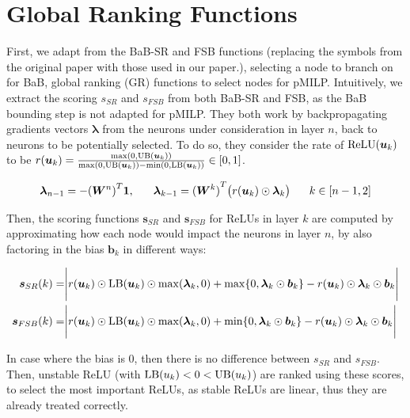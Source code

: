 \section{Global Ranking Functions}

\label{sec4p5}

First, we adapt from the BaB-SR \cite{BaB} and FSB \cite{FSB} functions (replacing the symbols from the original paper with those used in our paper.), selecting a node to branch on for BaB, global ranking (GR) functions to select nodes for pMILP. Intuitively, we extract the scoring $s_{SR}$ and $s_{FSB}$ from both BaB-SR and FSB, as the BaB bounding step is not adapted for pMILP. They both work by backpropagating gradients vectors $\bm{\lambda}$ from the neurons under consideration in layer $n$, back to neurons to be potentially selected. To do so, they consider the rate of $\mathrm{ReLU}(\bm{u}_k)$ to be 
$r(\bm{u}_k)=\frac{\max(0,\mathrm{UB}(\bm{u}_k))}{\max(0,\mathrm{UB}(\bm{u}_k))-\min(0,\mathrm{LB}(\bm{u}_k))} \in [0,1]$.

\begin{align*}
\bm{\lambda}_{n-1} = -{(\bm{W}^n)}^T\bm{1}, \hspace*{4ex}  	\bm{\lambda}_{k-1} = {(\bm{W}^k)}^T\big( r(\bm{u}_k) \odot\bm{\lambda}_{k}\big) \hspace*{4ex}  k\in [n-1,2]
\end{align*}


Then, the scoring functions $\bm{s}_{SR}$ and $\bm{s}_{FSB}$ for ReLUs in layer $k$ are computed by approximating how each node would impact the neurons in layer $n$, by also factoring in the bias $\bm{b}_k$ in different ways:

\begin{align*}
	\bm{s}_{SR}(k) =& %
	\Biggl\lvert r(\bm{u}_k) \odot \LB(\bm{u}_k) \odot \max(\bm{\lambda}_{k},0)
	+ \max\{0,\bm{\lambda}_{k}\odot\bm{b}_{k}\}-r(\bm{u}_k) \odot\bm{\lambda}_{k}\odot\bm{{b}}_{k}
	\Biggr\rvert  \\
	\bm{s}_{FSB}(k) =& \Biggl\lvert r(\bm{u}_k) \odot \LB(\bm{u}_k) \odot \max(\bm{\lambda}_{k},0)
	+ \min\{0,\bm{\lambda}_{k}\odot\bm{b}_{k}\}-r(\bm{u}_k) \odot\bm{\lambda}_{k}\odot\bm{{b}}_{k}
	\Biggr\rvert
\end{align*}

In case where the bias is 0, then there is no difference between $s_{SR}$ and $s_{FSB}$.
Then, unstable ReLU (with $\mathrm{LB}(u_k) < 0 < \mathrm{UB}(u_k)$) are ranked using these scores, to select the most important ReLUs, as stable ReLUs are linear, thus they are already treated correctly.



